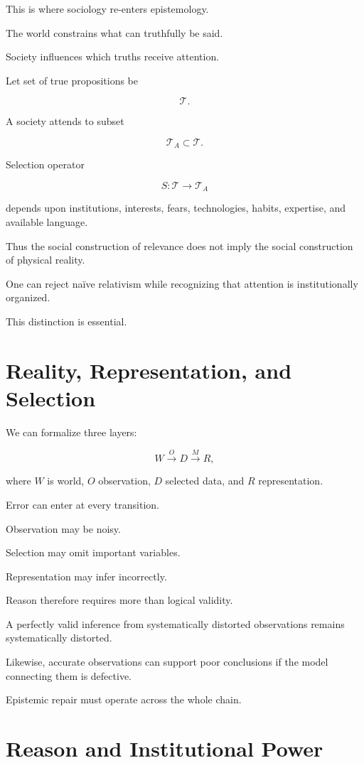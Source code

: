 \documentclass[11pt,oneside]{book}
\theoremstyle{definition}
\theoremstyle{remark}
\begin{document}
This is where sociology re-enters epistemology.

The world constrains what can truthfully be said.

Society influences which truths receive attention.

Let set of true propositions be

\[
\mathcal T.
\]

A society attends to subset

\[
\mathcal T_A\subset\mathcal T.
\]

Selection operator

\[
S:\mathcal T\rightarrow\mathcal T_A
\]

depends upon institutions, interests, fears, technologies, habits, expertise, and available language.

Thus the social construction of relevance does not imply the social construction of physical reality.

One can reject naïve relativism while recognizing that attention is institutionally organized.

This distinction is essential.

\section{Reality, Representation, and Selection}

We can formalize three layers:

\[
W
\xrightarrow{O}
D
\xrightarrow{M}
R,
\]

where \(W\) is world, \(O\) observation, \(D\) selected data, and \(R\) representation.

Error can enter at every transition.

Observation may be noisy.

Selection may omit important variables.

Representation may infer incorrectly.

Reason therefore requires more than logical validity.

A perfectly valid inference from systematically distorted observations remains systematically distorted.

Likewise, accurate observations can support poor conclusions if the model connecting them is defective.

Epistemic repair must operate across the whole chain.

\section{Reason and Institutional Power}
\end{document}
